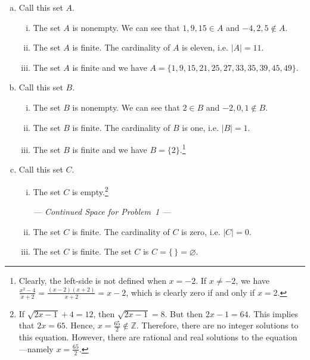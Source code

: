 \documentclass[11pt,letterpaper]{article}
\begin{document}
\sol 
\begin{enumerate}[(a)]
\item Call this set $A$. 
	\begin{enumerate}[(i)]
	\item The set $A$ is nonempty. We can see that $1, 9, 15 \in A$ and $-4, 2, 5 \notin A$. 
	\item The set $A$ is finite. The cardinality of $A$ is eleven, i.e. $|A|= 11$. 
	\item The set $A$ is finite and we have $A= \{ 1, 9, 15, 21, 25, 27, 33, 35, 39, 45, 49 \}$. 
	\end{enumerate} \pspace

\item Call this set $B$.
	\begin{enumerate}[(i)]
	\item The set $B$ is nonempty. We can see that $2 \in B$ and $-2, 0, 1 \notin B$. 
	\item The set $B$ is finite. The cardinality of $B$ is one, i.e. $|B|= 1$. 
	\item The set $B$ is finite and we have $B= \{ 2 \}$.\footnote{Clearly, the left-side is not defined when $x= -2$. If $x \neq -2$, we have $\frac{x^2 - 4}{x + 2}= \frac{(x - 2)(x + 2)}{x + 2}= x - 2$, which is clearly zero if and only if $x= 2$.}
	\end{enumerate} \pspace

\item Call this set $C$. 
	\begin{enumerate}[(i)]
	\item The set $C$ is empty.\footnote{If $\sqrt{2x - 1} + 4= 12$, then $\sqrt{2x - 1}= 8$. But then $2x - 1= 64$. This implies that $2x= 65$. Hence, $x= \frac{65}{2} \notin \mathbb{Z}$. Therefore, there are no integer solutions to this equation. However, there are rational and real solutions to the equation---namely $x= \frac{65}{2}$.}
	
	\newpage \begin{center} {\itshape --- Continued Space for Problem~1 ---} \end{center} \pspace


	\item The set $C$ is finite. The cardinality of $C$ is zero, i.e. $|C|= 0$. 
	\item The set $C$ is finite. The set $C$ is $C= \{ \,\}= \varnothing$. 
	\end{enumerate} \pspace


\end{enumerate}
\end{document}
